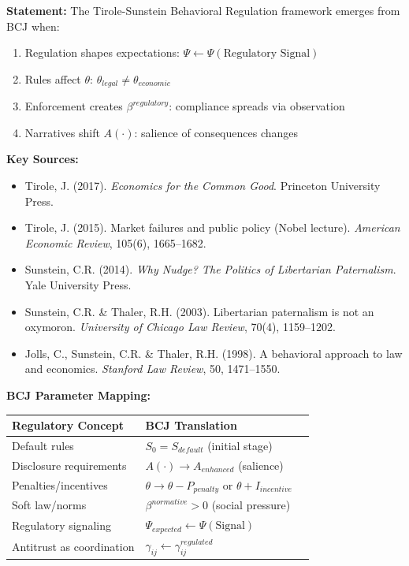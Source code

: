 \begin{tcolorbox}[colback=green!5!white, colframe=green!75!black,
    title=Theorem BCJ-T44: Behavioral Regulation as Special Case]
\textbf{Statement:} The Tirole-Sunstein Behavioral Regulation framework emerges from BCJ when:
\begin{enumerate}[nosep]
\item Regulation shapes expectations: $\Psi \leftarrow \Psi(\text{Regulatory Signal})$
\item Rules affect $\theta$: $\theta_{legal} \neq \theta_{economic}$
\item Enforcement creates $\beta^{regulatory}$: compliance spreads via observation
\item Narratives shift $A(\cdot)$: salience of consequences changes
\end{enumerate}

\textbf{Key Sources:}
\begin{itemize}[nosep]
\item Tirole, J. (2017). \textit{Economics for the Common Good}. Princeton University Press.
\item Tirole, J. (2015). Market failures and public policy (Nobel lecture). \textit{American Economic Review}, 105(6), 1665--1682.
\item Sunstein, C.R. (2014). \textit{Why Nudge? The Politics of Libertarian Paternalism}. Yale University Press.
\item Sunstein, C.R. \& Thaler, R.H. (2003). Libertarian paternalism is not an oxymoron. \textit{University of Chicago Law Review}, 70(4), 1159--1202.
\item Jolls, C., Sunstein, C.R. \& Thaler, R.H. (1998). A behavioral approach to law and economics. \textit{Stanford Law Review}, 50, 1471--1550.
\end{itemize}

\textbf{BCJ Parameter Mapping:}
\begin{center}
\begin{tabular}{lll}
\toprule
\textbf{Regulatory Concept} & \textbf{BCJ Translation} \\
\midrule
Default rules & $S_0 = S_{default}$ (initial stage) \\
Disclosure requirements & $A(\cdot) \to A_{enhanced}$ (salience) \\
Penalties/incentives & $\theta \to \theta - P_{penalty}$ or $\theta + I_{incentive}$ \\
Soft law/norms & $\beta^{normative} > 0$ (social pressure) \\
Regulatory signaling & $\Psi_{expected} \leftarrow \Psi(\text{Signal})$ \\
Antitrust as coordination & $\gamma_{ij} \leftarrow \gamma_{ij}^{regulated}$ \\
\bottomrule
\end{tabular}
\end{center}


\end{tcolorbox}
